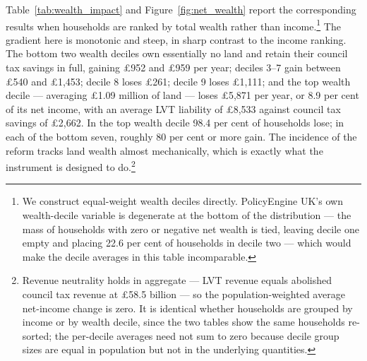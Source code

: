 Table~\ref{tab:wealth_impact} and Figure~\ref{fig:net_wealth} report the corresponding results when households are ranked by total wealth rather than income.\footnote{We construct equal-weight wealth deciles directly. PolicyEngine UK's own wealth-decile variable is degenerate at the bottom of the distribution --- the mass of households with zero or negative net wealth is tied, leaving decile one empty and placing 22.6 per cent of households in decile two --- which would make the decile averages in this table incomparable.} The gradient here is monotonic and steep, in sharp contrast to the income ranking. The bottom two wealth deciles own essentially no land and retain their council tax savings in full, gaining \pounds 952 and \pounds 959 per year; deciles 3--7 gain between \pounds 540 and \pounds 1{,}453; decile 8 loses \pounds 261; decile 9 loses \pounds 1{,}111; and the top wealth decile --- averaging \pounds 1.09 million of land --- loses \pounds 5{,}871 per year, or 8.9 per cent of its net income, with an average LVT liability of \pounds 8{,}533 against council tax savings of \pounds 2{,}662. In the top wealth decile 98.4 per cent of households lose; in each of the bottom seven, roughly 80 per cent or more gain. The incidence of the reform tracks land wealth almost mechanically, which is exactly what the instrument is designed to do.\footnote{Revenue neutrality holds in aggregate --- LVT revenue equals abolished council tax revenue at \pounds 58.5 billion --- so the population-weighted average net-income change is zero. It is identical whether households are grouped by income or by wealth decile, since the two tables show the same households re-sorted; the per-decile averages need not sum to zero because decile group sizes are equal in population but not in the underlying quantities.}

